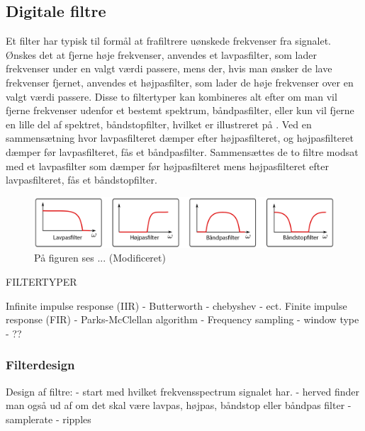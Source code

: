 \subsection{Digitale filtre}


Et filter har typisk til formål at frafiltrere uønskede frekvenser fra signalet. Ønskes det at fjerne høje frekvenser, anvendes et lavpasfilter, som lader frekvenser under en valgt værdi passere, mens der, hvis man ønsker de lave frekvenser fjernet, anvendes et højpasfilter, som lader de høje frekvenser over en valgt værdi passere. Disse to filtertyper kan kombineres alt efter om man vil fjerne frekvenser udenfor et bestemt spektrum, båndpasfilter, eller kun vil fjerne en lille del af spektret, båndstopfilter, hvilket er illustreret på . Ved en sammensætning hvor lavpasfilteret dæmper efter højpasfilteret, og højpasfilteret dæmper før lavpasfilteret, fås et båndpasfilter. Sammensættes de to filtre modsat med et lavpasfilter som dæmper før højpasfilteret mens højpasfilteret efter lavpasfilteret, fås et båndstopfilter.
\citep{Ramsden2001}

\begin{figure}[H]
	\centering
	\includegraphics[scale=0.2]{figures/bProblemloesning/filtre.png}
	\caption{På figuren ses ... \citep{Aasvik2016} (Modificeret)}
	\label{fig:filtre}
\end{figure}

FILTERTYPER

Infinite impulse response (IIR)
- Butterworth
- chebyshev 
- ect. 
Finite impulse response (FIR)
- Parks-McClellan algorithm
- Frequency sampling
- window type
- ??




\subsubsection{Filterdesign}


Design af filtre: 
- start med hvilket frekvensspectrum signalet har.
- herved finder man også ud af om det skal være lavpas, højpas, båndstop eller båndpas filter
- samplerate
- ripples


